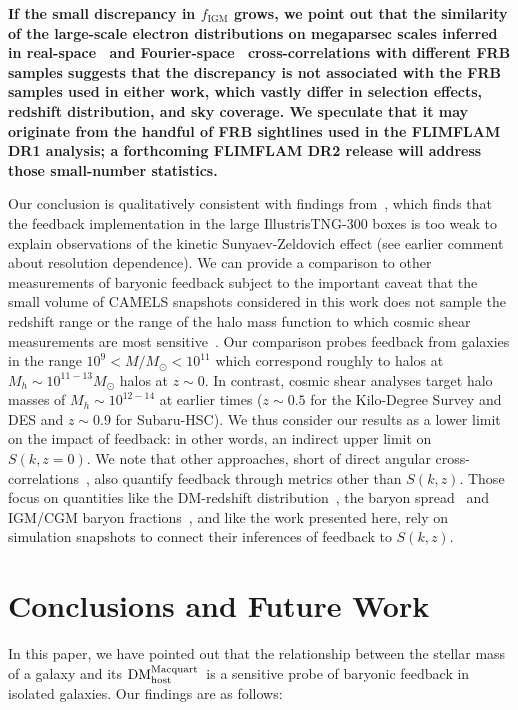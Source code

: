 \documentclass[twocolumn,linenumbers]{aastex631}
\newcommand{\msbold}[1]{\textbf{#1}}
\newcommand{\dmhm}{\ensuremath{{\rm DM}_\textrm{host}^\textrm{Macquart}}}
\begin{document}
\msbold{If the small discrepancy in $f_\mathrm{IGM}$ grows, we point out that the similarity of the large-scale electron distributions on megaparsec scales inferred in real-space~\citep{hussaini2025correlation} and Fourier-space~\citep{wang2025measurement} cross-correlations with different FRB samples suggests that the discrepancy is not associated with the FRB samples used in either work, which vastly differ in selection effects, redshift distribution, and sky coverage. We speculate that it may originate from the handful of FRB sightlines used in the FLIMFLAM DR1 analysis; a forthcoming FLIMFLAM DR2 release will address those small-number statistics.}

Our conclusion is qualitatively consistent with findings from~\citet{hadzhiyska2024evidence}, which finds that the feedback implementation in the large IllustrisTNG-300 boxes is too weak to explain observations of the kinetic Sunyaev-Zeldovich effect (see earlier comment about resolution dependence). We can provide a comparison to other measurements of baryonic feedback subject to the important caveat that the small volume of CAMELS snapshots considered in this work does not sample the redshift range or the range of the halo mass function to which cosmic shear measurements are most sensitive~\citep{tr_oster2022joint,aric_o2023des,terasawa2025exploring}. Our comparison probes feedback from galaxies in the range $10^9 < M/M_\odot < 10^{11}$ which correspond roughly to halos at $M_h \sim 10^{11-13} M_\odot$ halos at $z \sim 0$. In contrast, cosmic shear analyses target halo masses of $M_h \sim 10^{12-14}$ at earlier times ($z \sim 0.5$ for the Kilo-Degree Survey and DES and $z\sim 0.9$ for Subaru-HSC). 
We thus consider our results as a lower limit on the impact of feedback: in other words, an indirect upper limit on $S(k,z=0)$. We note that other approaches, short of direct angular cross-correlations~\citep{wang2025measurement}, also quantify feedback through metrics other than $S(k,z)$. Those focus on quantities like the DM-redshift distribution~\citep{macquart2020census,james2021z,sharma2025hydrodynamical}, the baryon spread~\citep{medlock2025constraining} and IGM/CGM baryon fractions~\citep[see e.g.,][]{khrykin2024flimflam,khrykin2024cosmic,connor2024gas,hussaini2025correlation}, and like the work presented here, rely on simulation snapshots to connect their inferences of feedback to $S(k,z)$.

\section{Conclusions and Future Work}
In this paper, we have pointed out that the relationship between the stellar mass of a galaxy and its \dmhm\ is a sensitive probe of baryonic feedback in isolated galaxies. Our findings are as follows:
\end{document}
